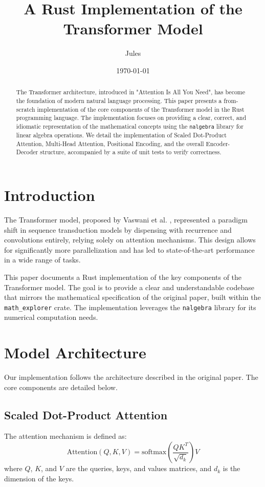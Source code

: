 \documentclass{article}
\title{A Rust Implementation of the Transformer Model}
\author{Jules}
\date{\today}
\begin{document}
\maketitle

\begin{abstract}
The Transformer architecture, introduced in "Attention Is All You Need", has become the foundation of modern natural language processing. This paper presents a from-scratch implementation of the core components of the Transformer model in the Rust programming language. The implementation focuses on providing a clear, correct, and idiomatic representation of the mathematical concepts using the \texttt{nalgebra} library for linear algebra operations. We detail the implementation of Scaled Dot-Product Attention, Multi-Head Attention, Positional Encoding, and the overall Encoder-Decoder structure, accompanied by a suite of unit tests to verify correctness.
\end{abstract}

\section{Introduction}
The Transformer model, proposed by Vaswani et al. \cite{vaswani2017attention}, represented a paradigm shift in sequence transduction models by dispensing with recurrence and convolutions entirely, relying solely on attention mechanisms. This design allows for significantly more parallelization and has led to state-of-the-art performance in a wide range of tasks.

This paper documents a Rust implementation of the key components of the Transformer model. The goal is to provide a clear and understandable codebase that mirrors the mathematical specification of the original paper, built within the \texttt{math\_explorer} crate. The implementation leverages the \texttt{nalgebra} library \cite{nalgebra} for its numerical computation needs.

\section{Model Architecture}
Our implementation follows the architecture described in the original paper. The core components are detailed below.

\subsection{Scaled Dot-Product Attention}
The attention mechanism is defined as:
\[ \text{Attention}(Q, K, V) = \text{softmax}\left(\frac{QK^T}{\sqrt{d_k}}\right)V \]
where $Q$, $K$, and $V$ are the queries, keys, and values matrices, and $d_k$ is the dimension of the keys.
\end{document}
